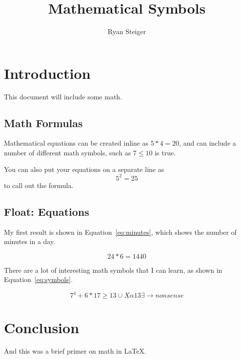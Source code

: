 \documentclass{article}
\title{Mathematical Symbols}
\author{Ryan Steiger}
\date{}
\begin{document}
\maketitle

\section{Introduction}

This document will include some math.

\subsection{Math Formulas}

Mathematical equations can be created inline as $5*4=20$, and can include a number of different math symbols, such as $7 \leq 10$ is true.

You can also put your equations on a separate line as \[5^2 = 25 \] to call out the formula.

\subsection{Float: Equations}

My first result is shown in Equation~\ref{eq:minutes}, which shows the number of minutes in a day.

\begin{equation}
  24*6 = 1440
  \label{eq:minutes}
\end{equation}

There are a lot of interesting math symbols that I can learn, as shown in Equation~\ref{eq:symbols}.

\begin{equation}
  7^4+6*17 \geq 13 \cup X \alpha 13 \exists \rightarrow nonsense
  \label{eq:symbols}
\end{equation}

\section{Conclusion}

And this was a brief primer on math in \LaTeX.
\end{document}
